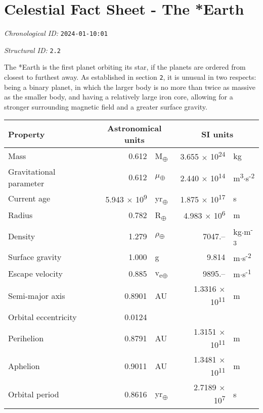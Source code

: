 \section{Celestial Fact Sheet - The *Earth}
\emph{Chronological ID:} \texttt{2024-01-10:01}

\emph{Structural ID:} \texttt{2.2}

The *Earth is the first planet orbiting its star, if the planets are ordered from closest to furthest away. As established in section \texttt{2}, it is unusual in two respects: being a binary planet, in which the larger body is no more than twice as massive as the smaller body, and having a relatively large iron core, allowing for a stronger surrounding magnetic field and a greater surface gravity.

\begin{tabular}{|p{4cm}|r l|r l|}
  \hline
  Property & \multicolumn{2}{c|}{Astronomical units} & \multicolumn{2}{c|}{SI units} \\
  \hline \hline
  Mass & 0.612 & M\textsubscript{$\oplus$} & 3.655 $\times$ 10\textsuperscript{24} & kg \\
  Gravitational parameter & 0.612 & $\mu$\textsubscript{$\oplus$} & 2.440 $\times$ 10\textsuperscript{14} & m\textsuperscript{3}$\cdot$s\textsuperscript{-2} \\
  Current age & 5.943 $\times$ 10\textsuperscript{9} & yr\textsubscript{$\oplus$} & 1.875 $\times$ 10\textsuperscript{17} & s \\
  Radius & 0.782 & R\textsubscript{$\oplus$} & 4.983 $\times$ 10\textsuperscript{6} & m \\
  Density & 1.279 & $\rho$\textsubscript{$\oplus$} & 7047.-- & kg$\cdot$m\textsuperscript{-3} \\
  Surface gravity & 1.000 & g & 9.814 & m$\cdot$s\textsuperscript{-2} \\
  Escape velocity & 0.885 & v\textsubscript{e$\oplus$} & 9895.-- & m$\cdot$s\textsuperscript{-1} \\
  Semi-major axis & 0.8901 & AU & 1.3316 $\times$ 10\textsuperscript{11} & m \\
  Orbital eccentricity & 0.0124 & & & \\
  Perihelion & 0.8791 & AU & 1.3151 $\times$ 10\textsuperscript{11} & m \\
  Aphelion & 0.9011 & AU & 1.3481 $\times$ 10\textsuperscript{11} & m \\
  Orbital period & 0.8616 & yr\textsubscript{$\oplus$} & 2.7189 $\times$ 10\textsuperscript{7} & s \\

\end{tabular}
